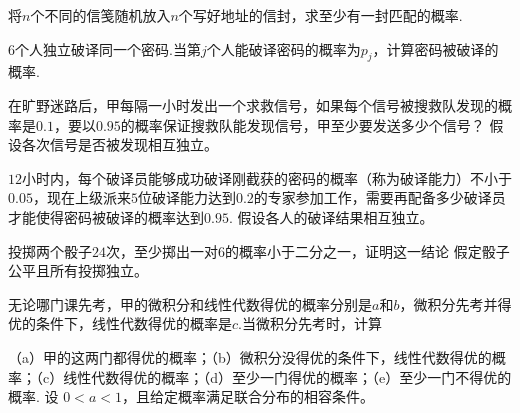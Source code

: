 \begin{exercise}[信封匹配与容斥]\label{q:Y2.5}
将$n$个不同的信笺随机放入$n$个写好地址的信封，求至少有一封匹配的概率.\par{}\end{exercise}

\begin{exercise}[独立任务的共同成功]\label{q:Y2.6}
$6$个人独立破译同一个密码.当第$j$个人能破译密码的概率为$p_j$，计算密码被破译的概率.\par{}\end{exercise}

\begin{exercise}[发现信号的试验次数]\label{q:Y2.7}
在旷野迷路后，甲每隔一小时发出一个求救信号，如果每个信号被搜救队发现的概率是$0.1$，要以$0.95$的概率保证搜救队能发现信号，甲至少要发送多少个信号？ 假设各次信号是否被发现相互独立。\par{}\end{exercise}

\begin{exercise}[保证成功概率的人员数]\label{q:Y2.9}
$12$小时内，每个破译员能够成功破译刚截获的密码的概率（称为破译能力）不小于$0.05$，现在上级派来$5$位破译能力达到$0.2$的专家参加工作，需要再配备多少破译员才能使得密码被破译的概率达到$0.95$. 假设各人的破译结果相互独立。\par{}\end{exercise}

\begin{exercise}[德梅雷的骰子问题]\label{q:Y2.10}
投掷两个骰子$24$次，至少掷出一对$6$的概率小于二分之一，证明这一结论 假定骰子公平且所有投掷独立。\par{}\end{exercise}

\begin{exercise}[条件成绩概率]\label{q:Y2.11}
无论哪门课先考，甲的微积分和线性代数得优的概率分别是$a$和$b$，微积分先考并得优的条件下，线性代数得优的概率是$c$.当微积分先考时，计算

（a）甲的这两门都得优的概率；（b）微积分没得优的条件下，线性代数得优的概率；（c）线性代数得优的概率；（d）至少一门得优的概率；（e）至少一门不得优的概率. 设 $0<a<1$，且给定概率满足联合分布的相容条件。\par{}\end{exercise}

